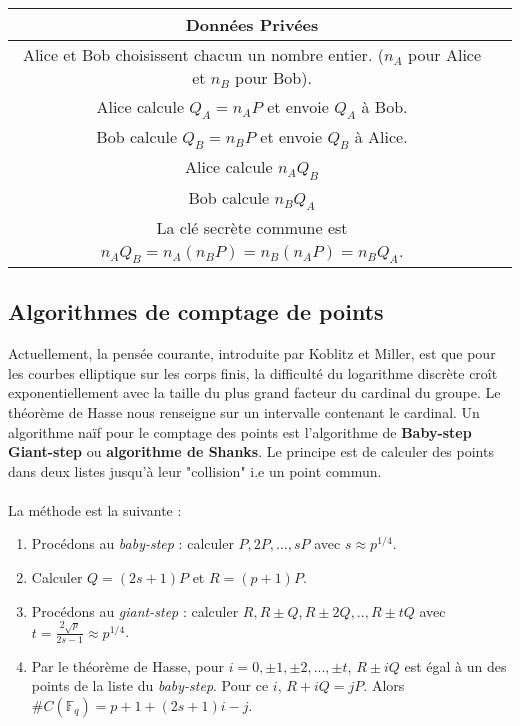 \documentclass[a4paper]{article}
\begin{document}
\begin{center}
\begin{tabular}{|c|c|} 
\hline

\multicolumn{1}{|c|}{Données Privées}  \\ 
 
\hline
Alice et Bob choisissent chacun un nombre entier. ($n_{A}$ pour Alice et $n_{B}$ pour Bob). \\ 
\hline
Alice calcule $Q_{A}=n_{A}P$ et envoie $Q_{A}$ à Bob.\\ 
Bob calcule $Q_{B}=n_{B}P$ et envoie $Q_{B}$ à Alice.  \\ \hline
Alice calcule $n_{A}Q_{B}$ \\
Bob calcule $n_{B}Q_{A}$ \\
\hline
La clé secrète commune est $n_{A}Q_{B}=n_{A}(n_{B}P)=n_{B}(n_{A}P)=n_{B}Q_{A}$. \\
\hline
\end{tabular}
\end{center}

\subsection{Algorithmes de comptage de points}

\noindent Actuellement, la pensée courante, introduite par Koblitz et Miller, est que pour les courbes elliptique sur les corps finis, la difficulté du logarithme discrète croît exponentiellement avec la taille du plus grand facteur du cardinal du groupe. Le théorème de Hasse nous renseigne sur un intervalle contenant le cardinal.
Un algorithme naïf pour le comptage des points est l'algorithme de
\textbf{Baby-step Giant-step} ou \textbf{algorithme de Shanks}. Le principe est de calculer des points dans deux listes jusqu'à leur "collision" i.e un point commun. 
\ \\ \\
La méthode est la suivante :
\begin{enumerate}
\item Procédons au \textit{baby-step} : calculer $P,2P,...,sP$ avec $s \approx p^{1/4}$.
\item Calculer $Q=(2s+1)P$ et $R=(p+1)P$.
\item Procédons au \textit{giant-step} : calculer $R,R \pm Q,R \pm 2Q,.., R \pm tQ$ avec \\ $t=\frac{2\sqrt{p}}{2s-1} \approx p^{1/4}$.
\item Par le théorème de Hasse, pour $i=0,\pm 1,\pm 2 ,..., \pm t$, $R \pm iQ$ est égal à un des points de la liste du \textit{baby-step}. Pour ce $i$, $R+iQ=jP$.
Alors $\#C(\mathbb{F}_{q})=p+1+(2s+1)i-j$.
\end{enumerate}
\end{document}
